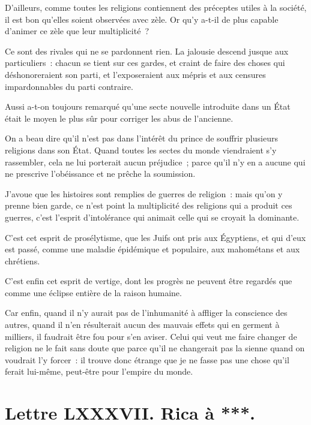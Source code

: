 \documentclass[french,twoside]{book} %
\newcommand{\dateline}[1]{\medskip{\RaggedLeft{#1}\par}\bigskip}
\begin{document}
D’ailleurs, comme toutes les religions contiennent des préceptes utiles à la société, il est bon qu’elles soient observées avec zèle. Or qu’y a-t-il de plus capable d’animer ce zèle que leur multiplicité ?\par
Ce sont des rivales qui ne se pardonnent rien. La jalousie descend jusque aux particuliers : chacun se tient sur ces gardes, et craint de faire des choses qui déshonoreraient son parti, et l’exposeraient aux mépris et aux censures impardonnables du parti contraire.\par
Aussi a-t-on toujours remarqué qu’une secte nouvelle introduite dans un État était le moyen le plus sûr pour corriger les abus de l’ancienne.\par
On a beau dire qu’il n’est pas dans l’intérêt du prince de souffrir plusieurs religions dans son État. Quand toutes les sectes du monde viendraient s’y rassembler, cela ne lui porterait aucun préjudice ; parce qu’il n’y en a aucune qui ne prescrive l’obéissance et ne prêche la soumission.\par
J’avoue que les histoires sont remplies de guerres de religion : mais qu’on y prenne bien garde, ce n’est point la multiplicité des religions qui a produit ces guerres, c’est l’esprit d’intolérance qui animait celle qui se croyait la dominante.\par
C’est cet esprit de prosélytisme, que les Juifs ont pris aux Égyptiens, et qui d’eux est passé, comme une maladie épidémique et populaire, aux mahométans et aux chrétiens.\par
C’est enfin cet esprit de vertige, dont les progrès ne peuvent être regardés que comme une éclipse entière de la raison humaine.\par
Car enfin, quand il n’y aurait pas de l’inhumanité à affliger la conscience des autres, quand il n’en résulterait aucun des mauvais effets qui en germent à milliers, il faudrait être fou pour s’en aviser. Celui qui veut me faire changer de religion ne le fait sans doute que parce qu’il ne changerait pas la sienne quand on voudrait l’y forcer : il trouve donc étrange que je ne fasse pas une chose qu’il ferait lui-même, peut-être pour l’empire du monde.\par

\dateline{À Paris, le 26 de la lune de Gemmadi 1, 1715.}
\section[{Lettre LXXXVII. Rica à ***.}]{Lettre LXXXVII. Rica à ***.}\renewcommand{\leftmark}{Lettre LXXXVII. Rica à ***.}
\end{document}
